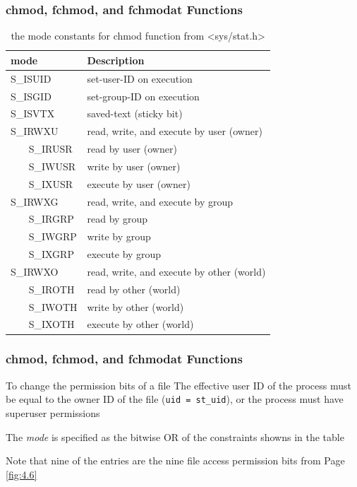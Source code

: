 \documentclass[newPxFont,sthlmFooter,nooffset]{beamer}
\begin{document}
\begin{frame}
  \frametitle{chmod, fchmod, and fchmodat Functions}

{\footnotesize
\begin{table}[t]
\centering
\begin{tabular}[t]{l | l }
mode 	&	Description 	\\ \hline
S\_ISUID	&	set-user-ID on execution 	\\ \hline
S\_ISGID	&	set-group-ID on execution 	\\ \hline
S\_ISVTX	&	saved-text (sticky bit) 	\\ \hline
S\_IRWXU	&	read, write, and execute by user (owner) 	\\ \hline
~~~   S\_IRUSR	&	read by user (owner)	\\ \hline
~~~   S\_IWUSR	&	write by user (owner)	\\ \hline
~~~   S\_IXUSR	&	execute by user (owner) 	\\ \hline
S\_IRWXG	&	read, write, and execute by group 	\\ \hline
~~~   S\_IRGRP	&	read by group	\\ \hline
~~~   S\_IWGRP	&	write by group	\\ \hline
~~~   S\_IXGRP	&	execute by group 	\\ \hline
S\_IRWXO	&	read, write, and execute by other (world) 	\\ \hline
~~~   S\_IROTH	&	read by other (world)	\\ \hline
~~~   S\_IWOTH	&	write by other (world)	\\ \hline
~~~   S\_IXOTH	&	execute by other (world) 	\\ \hline
\end{tabular}
\caption{the mode constants for chmod function from <sys/stat.h>}
\label{tab:fig:4.11}
\end{table}
}

\end{frame}




\begin{frame}[t]
    \frametitle{chmod, fchmod, and fchmodat Functions}
\begin{block}{To change the permission bits of a file}
The effective user ID of the process must be equal to the owner ID of the file (\texttt{uid = st\_uid}), or the process must have superuser permissions
\end{block}

The \textit{mode} is specified as the bitwise OR of the constraints showns in the table
\bigskip

Note that nine of the entries are the nine file access permission bits from Page \ref{fig:4.6}

\end{frame}
\end{document}
